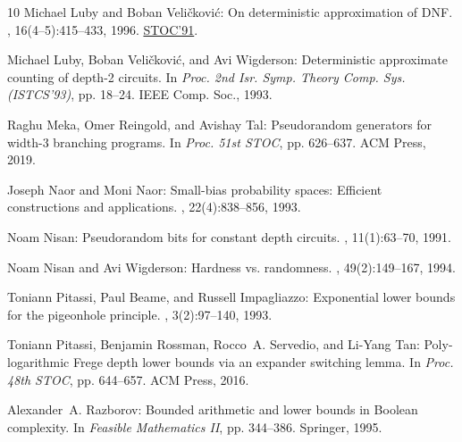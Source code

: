 \documentclass[11pt]{article}
\numberwithin{equation}{section}
\theoremstyle{definition}
\theoremstyle{plain}
\theoremstyle{plain}
\begin{document}
\begin{thebibliography}{10}
{\sc Michael Luby and Boban Veli{\v{c}}kovi{\'c}}: On deterministic
  approximation of {DNF}.
, 16(4--5):415--433, 1996.
\newblock \prelim \href{https://doi.org/10.1145/103418.103464}{STOC'91}.
\newblock [\epfmtdoi{10.1007/BF01940873}]

{\sc Michael Luby, Boban Veli{\v{c}}kovi{\'c}, and Avi Wigderson}:
  Deterministic approximate counting of depth-2 circuits.
\newblock In {\em Proc. 2nd Isr. Symp. Theory Comp. Sys. (ISTCS'93)}, pp.
  18--24. IEEE Comp. Soc., 1993.

{\sc Raghu Meka, Omer Reingold, and Avishay Tal}: Pseudorandom generators for
  width-3 branching programs.
\newblock In {\em Proc. 51st STOC}, pp. 626--637. ACM Press, 2019.

{\sc Joseph Naor and Moni Naor}: Small-bias probability spaces: {E}fficient
  constructions and applications.
, 22(4):838--856, 1993.
\newblock [\epfmtdoi{10.1137/0222053}]

{\sc Noam Nisan}: Pseudorandom bits for constant depth circuits.
, 11(1):63--70, 1991.
\newblock [\epfmtdoi{10.1007/BF01375474}]

{\sc Noam Nisan and Avi Wigderson}: Hardness vs. randomness.
, 49(2):149--167, 1994.
\newblock [\epfmtdoi{10.1016/S0022-0000(05)80043-1}]

{\sc Toniann Pitassi, Paul Beame, and Russell Impagliazzo}: Exponential lower
  bounds for the pigeonhole principle.
, 3(2):97--140, 1993.
\newblock [\epfmtdoi{10.1007/BF01200117}]

{\sc Toniann Pitassi, Benjamin Rossman, Rocco~A. Servedio, and Li{-}Yang Tan}:
  Poly-logarithmic {F}rege depth lower bounds via an expander switching lemma.
\newblock In {\em Proc. 48th STOC}, pp. 644--657. ACM Press, 2016.
\newblock [\epfmtdoi{10.1145/2897518.2897637}]

{\sc Alexander~A. Razborov}: Bounded arithmetic and lower bounds in {B}oolean
  complexity.
\newblock In {\em Feasible Mathematics II}, pp. 344--386. Springer, 1995.
\newblock [\epfmtdoi{10.1007/978-1-4612-2566-9\_12}]


\end{thebibliography}
\end{document}
